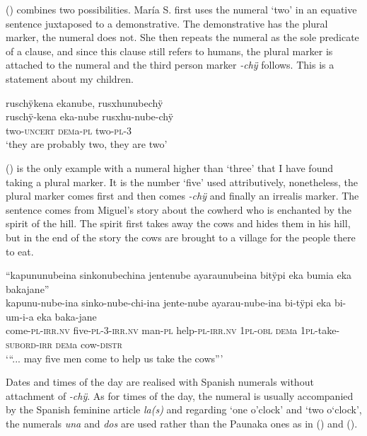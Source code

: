 () combines two possibilities. María S. first uses the numeral ‘two’ in an equative sentence juxtaposed to a demonstrative. The demonstrative has the plural marker, the numeral does not. She then repeats the numeral as the sole predicate of a clause, and since this clause still refers to humans, the plural marker is attached to the numeral and the third person marker \textit{-chÿ} follows. This is a statement about my children.

\ea\label{ex:two-4}
\begingl
\glpreamble ruschÿkena ekanube, rusxhunubechÿ\\
\gla ruschÿ-kena eka-nube rusxhu-nube-chÿ\\
\glb two-\textsc{uncert} \textsc{dem}a-\textsc{pl} two-\textsc{pl}-3\\
\glft ‘they are probably two, they are two’
\endgl
\trailingcitation{[rmx-e150922l.078]}
\xe

() is the only example with a numeral higher than ‘three’ that I have found taking a plural marker. It is the number ‘five’ used attributively, nonetheless, the plural marker comes first and then comes \textit{-chÿ} and finally an irrealis marker. The sentence comes from Miguel’s story about the cowherd who is enchanted by the spirit of the hill. The spirit first takes away the cows and hides them in his hill, but in the end of the story the cows are brought to a village for the people there to eat. 

\ea\label{ex:five-1}
\begingl 
\glpreamble “kapununubeina sinkonubechina jentenube ayaraunubeina bitÿpi eka bumia eka bakajane”\\
\gla kapunu-nube-ina sinko-nube-chi-ina jente-nube ayarau-nube-ina bi-tÿpi eka bi-um-i-a eka baka-jane\\ 
\glb come-\textsc{pl}-\textsc{irr.nv} five-\textsc{pl}-3-\textsc{irr.nv} man-\textsc{pl} help-\textsc{pl}-\textsc{irr.nv} 1\textsc{pl}-\textsc{obl} \textsc{dem}a 1\textsc{pl}-take-\textsc{subord}-\textsc{irr} \textsc{dem}a cow-\textsc{distr}\\ 
\glft ‘“... may five men come to help us take the cows”’
\trailingcitation{[mxx-n151017l-1.78]}
\xe

Dates and times of the day are realised with Spanish numerals without attachment of \textit{-chÿ}. As for times of the day, the numeral is usually accompanied by the Spanish feminine article \textit{la(s)} and regarding ‘one o’clock’ and ‘two o‘clock’, the numerals \textit{una} and \textit{dos} are used rather than the Paunaka ones as in () and ().

